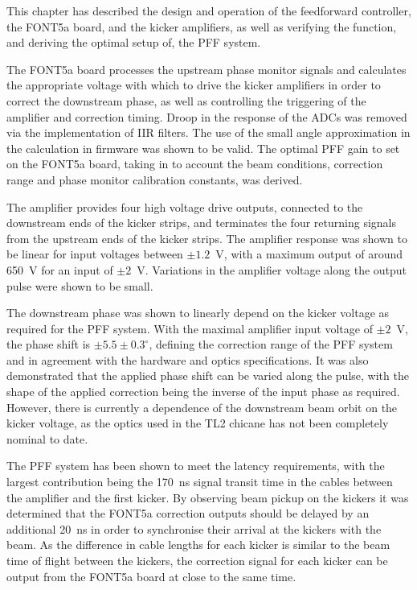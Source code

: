 %
%
%
%


This chapter has described the design and operation of the feedforward controller, the FONT5a board, and the kicker amplifiers, as well as verifying the function, and deriving the optimal setup of, the PFF system. 

The FONT5a board processes the upstream phase monitor signals and calculates the appropriate voltage with which to drive the kicker amplifiers in order to correct the downstream phase, as well as controlling the triggering of the amplifier and correction timing. Droop in the response of the ADCs was removed via the implementation of IIR filters. The use of the small angle approximation in the calculation in firmware was shown to be valid. The optimal PFF gain to set on the FONT5a board, taking in to account the beam conditions, correction range and phase monitor calibration constants, was derived.


The amplifier provides four high voltage drive outputs, connected to the downstream ends of the kicker strips, and terminates the four returning signals from the upstream ends of the kicker strips. The amplifier response was shown to be linear for input voltages between \(\pm1.2\)~V, with a maximum output of around 650~V for an input of \(\pm2\)~V. Variations in the amplifier voltage along the output pulse were shown to be small.

The downstream phase was shown to linearly depend on the kicker voltage as required for the PFF system. With the maximal amplifier input voltage of \(\pm2\)~V, the phase shift is \(\pm5.5\pm0.3^\circ\), defining the correction range of the PFF system and in agreement with the hardware and optics specifications. It was also demonstrated that the applied phase shift can be varied along the pulse, with the shape of the applied correction being the inverse of the input phase as required. However, there is currently a dependence of the downstream beam orbit on the kicker voltage, as the optics used in the TL2 chicane has not been completely nominal to date.
 
The PFF system has been shown to meet the latency requirements, with the largest contribution being the 170~ns signal transit time in the cables between the amplifier and the first kicker. By observing beam pickup on the kickers it was determined that the FONT5a correction outputs should be delayed by an additional 20~ns in order to synchronise their arrival at the kickers with the beam. As the difference in cable lengths for each kicker is similar to the beam time of flight between the kickers, the correction signal for each kicker can be output from the FONT5a board at close to the same time.